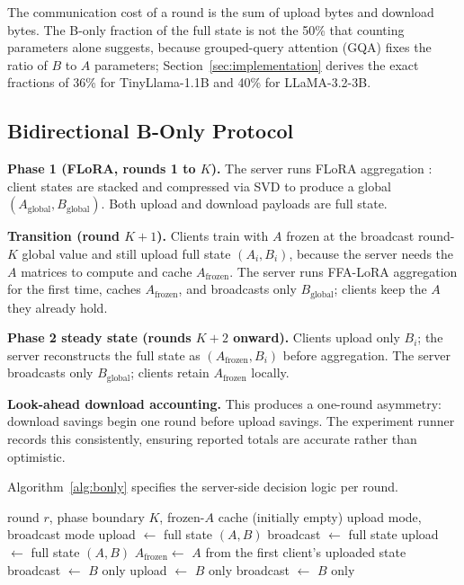 The communication cost of a round is the sum of upload bytes and download bytes. The B-only fraction of the full state is not the 50\% that counting parameters alone suggests, because grouped-query attention (GQA) fixes the ratio of $B$ to $A$ parameters; Section~\ref{sec:implementation} derives the exact fractions of 36\% for TinyLlama-1.1B and 40\% for LLaMA-3.2-3B.

\subsection{Bidirectional B-Only Protocol}
\textbf{Phase 1 (FLoRA, rounds 1 to $K$).}
The server runs FLoRA aggregation \cite{wang2024flora}: client states are stacked and compressed via SVD to produce a global $(A_{\text{global}}, B_{\text{global}})$. Both upload and download payloads are full state.

\textbf{Transition (round $K{+}1$).}
Clients train with $A$ frozen at the broadcast round-$K$ global value and still upload full state $(A_i, B_i)$, because the server needs the $A$ matrices to compute and cache $A_{\text{frozen}}$. The server runs FFA-LoRA \cite{sun2024ffalora} aggregation for the first time, caches $A_{\text{frozen}}$, and broadcasts only $B_{\text{global}}$; clients keep the $A$ they already hold.

\textbf{Phase 2 steady state (rounds $K{+}2$ onward).}
Clients upload only $B_i$; the server reconstructs the full state as $(A_{\text{frozen}}, B_i)$ before aggregation. The server broadcasts only $B_{\text{global}}$; clients retain $A_{\text{frozen}}$ locally.

\textbf{Look-ahead download accounting.}
This produces a one-round asymmetry: download savings begin one round before upload savings. The experiment runner records this consistently, ensuring reported totals are accurate rather than optimistic.

Algorithm~\ref{alg:bonly} specifies the server-side decision logic per round.

\begin{algorithm}[t]
\centering
\caption{Bidirectional B-only protocol (server, per round)}
\label{alg:bonly}
\footnotesize
\begin{algorithmic}[1]
\Require round $r$, phase boundary $K$, frozen-$A$ cache (initially empty)
\Ensure upload mode, broadcast mode
 
    \State upload $\leftarrow$ full state $(A, B)$
    \State broadcast $\leftarrow$ full state
 
    \State upload $\leftarrow$ full state $(A, B)$
    \State $A_{\text{frozen}} \leftarrow$ $A$ from the first client's uploaded state
    \State broadcast $\leftarrow$ $B$ only 
\Else {}
    \State upload $\leftarrow$ $B$ only 
    \State broadcast $\leftarrow$ $B$ only 
\EndIf
\end{algorithmic}
\end{algorithm}

